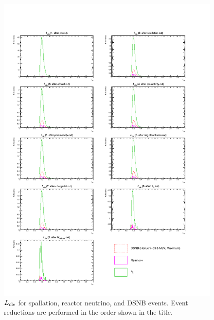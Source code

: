 \begin{figure}[h]
	\centering
	\includegraphics[width=15cm]{PDF/Dist_Nuebar/Che_50deg_tag_ge1/pilike}
	\caption[$L_{\rm cle}$ for spallation, reactor neutrino, and DSNB events]{
	$L_{\rm cle}$ for spallation, reactor neutrino, and DSNB events.
	Event reductions are performed in the order shown in the title.
	}\label{Nuebar_pilike}
\end{figure}

